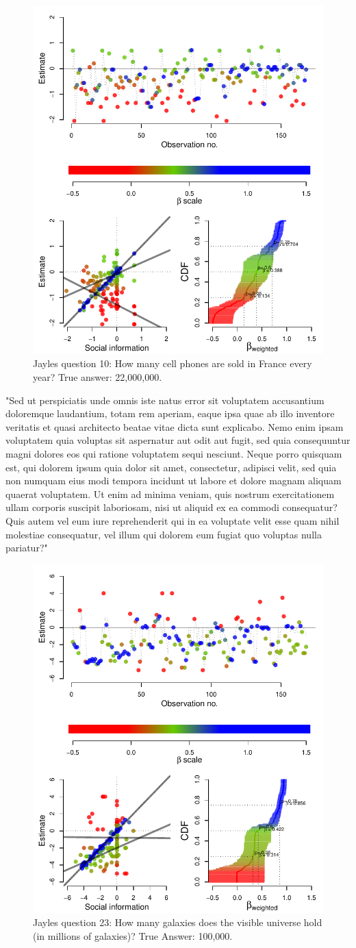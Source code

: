 \documentclass[9pt,twoside,lineno]{pnas-new}
\begin{document}
\begin{figure}[htbp]
	\centering\includegraphics[width=.5\textwidth]{../plots/jayles10.pdf}
	\caption{Jayles question 10: How many cell phones are sold in France every year? True answer: 22,000,000.}\label{fig: Jayles question 10}
\end{figure}

"Sed ut perspiciatis unde omnis iste natus error sit voluptatem accusantium doloremque laudantium, totam rem aperiam, eaque ipsa quae ab illo inventore veritatis et quasi architecto beatae vitae dicta sunt explicabo. Nemo enim ipsam voluptatem quia voluptas sit aspernatur aut odit aut fugit, sed quia consequuntur magni dolores eos qui ratione voluptatem sequi nesciunt. Neque porro quisquam est, qui dolorem ipsum quia dolor sit amet, consectetur, adipisci velit, sed quia non numquam eius modi tempora incidunt ut labore et dolore magnam aliquam quaerat voluptatem. Ut enim ad minima veniam, quis nostrum exercitationem ullam corporis suscipit laboriosam, nisi ut aliquid ex ea commodi consequatur? Quis autem vel eum iure reprehenderit qui in ea voluptate velit esse quam nihil molestiae consequatur, vel illum qui dolorem eum fugiat quo voluptas nulla pariatur?"

\begin{figure}[htbp]
	\centering\includegraphics[width=.5\textwidth]{../plots/jayles23.pdf}
	\caption{Jayles question 23: How many galaxies does the visible universe hold (in millions of galaxies)? True Answer: 100,000.}\label{fig: Jayles question 23}
\end{figure}
\end{document}
